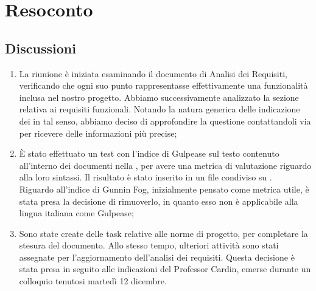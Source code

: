 \section{Resoconto} \label{sec:resoconto}
\subsection{Discussioni} \label{subsec:resdiscussione}
\begin{enumerate}
    \item  La riunione è iniziata esaminando il documento di Analisi dei Requisiti, verificando che ogni suo punto rappresentasse effettivamente una funzionalità inclusa nel nostro progetto. Abbiamo successivamente analizzato la sezione relativa ai requisiti funzionali. Notando la natura generica delle indicazione dei  in tal senso, abbiamo deciso di approfondire la questione contattandoli via  per ricevere delle informazioni più precise;
    
    \item È stato effettuato un test con l'indice di Gulpease sul testo contenuto all'interno dei documenti nella , per avere una metrica di valutazione riguardo alla loro sintassi. Il risultato è stato inserito in un file condiviso su . \\
    Riguardo all'indice di Gunnin Fog, inizialmente pensato come metrica utile, è stata presa la decisione di rimuoverlo, in quanto esso non è applicabile alla lingua italiana come Gulpease;

    \item Sono state create delle task relative alle norme di progetto, per completare la stesura del documento. Allo stesso tempo, ulteriori attività sono stati assegnate per l'aggiornamento dell'analisi dei requisiti. Questa decisione è stata presa in seguito alle indicazioni del Professor Cardin, emerse durante un colloquio tenutosi martedì 12 dicembre.
    
\end{enumerate}

